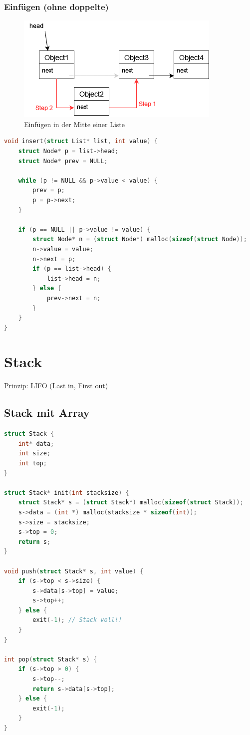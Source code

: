 \documentclass{article}
\begin{document}
\subsubsection{Einfügen (ohne doppelte)}

\begin{figure}[h!]
  \centering
  \includegraphics[scale=0.6]{list_insert.png}
  \caption{Einfügen in der Mitte einer Liste}
  \label{fig:list_insert}
\end{figure}

\begin{lstlisting}[language=c, tabsize=4]
void insert(struct List* list, int value) {
    struct Node* p = list->head;
    struct Node* prev = NULL;
    
    while (p != NULL && p->value < value) {
        prev = p;
        p = p->next;
    }
    
    if (p == NULL || p->value != value) {
        struct Node* n = (struct Node*) malloc(sizeof(struct Node));
        n->value = value;
        n->next = p;
        if (p == list->head) {
            list->head = n;
        } else {
            prev->next = n;
        }
    }
}
\end{lstlisting}
\newpage

\section{Stack}

Prinzip: LIFO (Last in, First out)

\subsection{Stack mit Array}

\begin{lstlisting}[language=c, tabsize=4]
struct Stack {
    int* data;
    int size;
    int top;
}

struct Stack* init(int stacksize) {
    struct Stack* s = (struct Stack*) malloc(sizeof(struct Stack));
    s->data = (int *) malloc(stacksize * sizeof(int));
    s->size = stacksize;
    s->top = 0;
    return s;
}

void push(struct Stack* s, int value) {
    if (s->top < s->size) {
        s->data[s->top] = value;
        s->top++;
    } else {
        exit(-1); // Stack voll!!
    }
}

int pop(struct Stack* s) {
    if (s->top > 0) {
        s->top--;
        return s->data[s->top];
    } else {
        exit(-1);
    }
}
\end{lstlisting}
\end{document}
